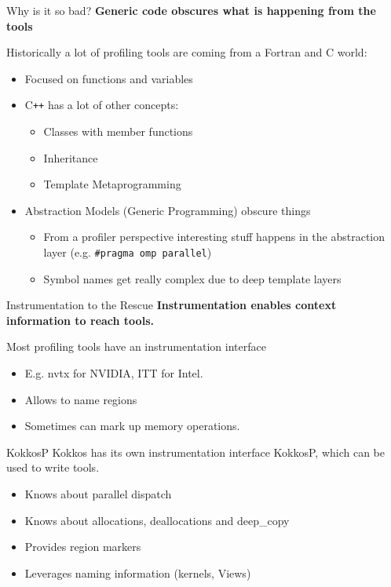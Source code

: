 \begin{frame}[fragile]{Why is it so bad?}
  \textbf{Generic code obscures what is happening from the tools}

  Historically a lot of profiling tools are coming from a Fortran and C world:

  \begin{itemize}
    \item Focused on functions and variables
    \item C\texttt{++} has a lot of other concepts:
    \begin{itemize}
      \item Classes with member functions
      \item Inheritance
      \item Template Metaprogramming
    \end{itemize}
    \item Abstraction Models (Generic Programming) obscure things
    \begin{itemize}
      \item From a profiler perspective interesting stuff happens in the abstraction layer (e.g. \texttt{\#pragma omp parallel})
      \item Symbol names get really complex due to deep template layers  
    \end{itemize}
  \end{itemize}

\end{frame}


\begin{frame}[fragile]{Instrumentation to the Rescue}
  \textbf{Instrumentation enables context information to reach tools.}

  \vspace{5pt}
  Most profiling tools have an instrumentation interface

  \begin{itemize}
    \item E.g. nvtx for NVIDIA, ITT for Intel.
    \item Allows to name regions
    \item Sometimes can mark up memory operations.
  \end{itemize}

  \pause
  \vspace{5pt}
  \begin{block}{KokkosP}
    Kokkos has its own instrumentation interface KokkosP, which can be used to write tools.
  \end{block}

  \begin{itemize}
    \item Knows about parallel dispatch
    \item Knows about allocations, deallocations and deep\_copy
    \item Provides region markers
    \item Leverages naming information (kernels, Views)
  \end{itemize}

\end{frame}

